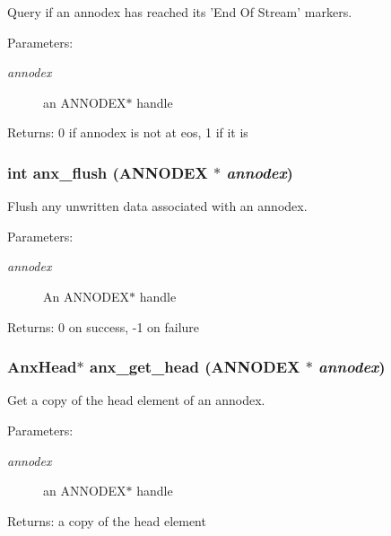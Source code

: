 Query if an annodex has reached its 'End Of Stream' markers. 

\begin{Desc}
\item[Parameters:]
\begin{description}
\item[{\em annodex}]an ANNODEX$\ast$ handle \end{description}
\end{Desc}
\begin{Desc}
\item[Returns:]0 if annodex is not at eos, 1 if it is \end{Desc}
\subsubsection{\setlength{\rightskip}{0pt plus 5cm}int anx\_\-flush ({\bf ANNODEX} $\ast$ {\em annodex})}\label{anx__general_8h_a6}


Flush any unwritten data associated with an annodex. 

\begin{Desc}
\item[Parameters:]
\begin{description}
\item[{\em annodex}]An ANNODEX$\ast$ handle \end{description}
\end{Desc}
\begin{Desc}
\item[Returns:]0 on success, -1 on failure \end{Desc}
\subsubsection{\setlength{\rightskip}{0pt plus 5cm}Anx\-Head$\ast$ anx\_\-get\_\-head ({\bf ANNODEX} $\ast$ {\em annodex})}\label{anx__general_8h_a12}


Get a copy of the head element of an annodex. 

\begin{Desc}
\item[Parameters:]
\begin{description}
\item[{\em annodex}]an ANNODEX$\ast$ handle \end{description}
\end{Desc}
\begin{Desc}
\item[Returns:]a copy of the head element \end{Desc}

